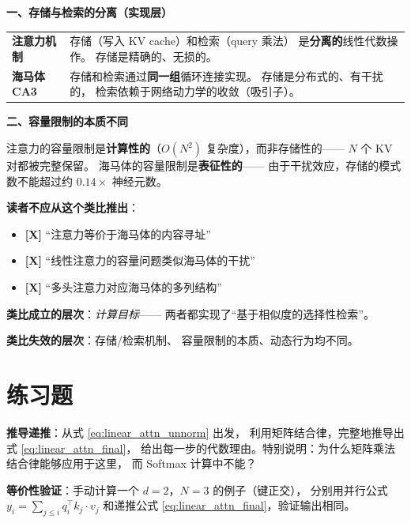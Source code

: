 \begin{analogyboundarybox}[title=这个类比在哪里失效]

\textbf{一、存储与检索的分离（实现层）}

\begin{tabular}{p{5cm} p{8cm}}
\textbf{注意力机制}
& 存储（写入 KV cache）和检索（query 乘法）
  是\textbf{分离的}线性代数操作。
  存储是精确的、无损的。 \\
\textbf{海马体 CA3}
& 存储和检索通过\textbf{同一组}循环连接实现。
  存储是分布式的、有干扰的，
  检索依赖于网络动力学的收敛（吸引子）。 \\
\end{tabular}

\medskip\textbf{二、容量限制的本质不同}

注意力的容量限制是\textbf{计算性的}（$O(N^2)$ 复杂度），而非存储性的——
$N$ 个 KV 对都被完整保留。
海马体的容量限制是\textbf{表征性的}——
由于干扰效应，存储的模式数不能超过约 $0.14 \times$ 神经元数。

\medskip\textbf{读者不应从这个类比推出}：
\begin{itemize}
  \item \textbf{[X]} ``注意力等价于海马体的内容寻址''
  \item \textbf{[X]} ``线性注意力的容量问题类似海马体的干扰''
  \item \textbf{[X]} ``多头注意力对应海马体的多列结构''
\end{itemize}

\medskip
\textbf{类比成立的层次}：\textit{计算目标}——
两者都实现了``基于相似度的选择性检索''。

\textbf{类比失效的层次}：存储/检索机制、
容量限制的本质、动态行为均不同。

\end{analogyboundarybox}

\section{练习题}
\label{sec:attn_exercises}

\begin{exercise}
\textbf{推导递推}：从式 \eqref{eq:linear_attn_unnorm} 出发，
利用矩阵结合律，完整地推导出式 \eqref{eq:linear_attn_final}，
给出每一步的代数理由。特别说明：为什么矩阵乘法结合律能够应用于这里，
而 Softmax 计算中不能？
\end{exercise}

\begin{exercise}
\textbf{等价性验证}：手动计算一个 $d=2$，$N=3$ 的例子（键正交），
分别用并行公式 $y_i = \sum_{j \le i} q_i^\top k_j \cdot v_j$
和递推公式 \eqref{eq:linear_attn_final}，验证输出相同。
\end{exercise}


